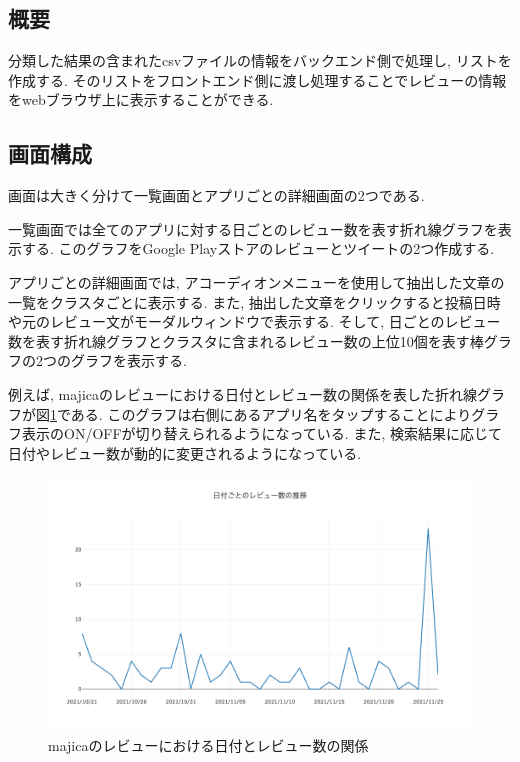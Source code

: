 \subsection{概要}
分類した結果の含まれたcsvファイルの情報をバックエンド側で処理し, リストを作成する. そのリストをフロントエンド側に渡し処理することでレビューの情報をwebブラウザ上に表示することができる. 

\subsection{画面構成}
画面は大きく分けて一覧画面とアプリごとの詳細画面の2つである. 

一覧画面では全てのアプリに対する日ごとのレビュー数を表す折れ線グラフを表示する. 
このグラフをGoogle Playストアのレビューとツイートの2つ作成する. 

アプリごとの詳細画面では, アコーディオンメニューを使用して抽出した文章の一覧をクラスタごとに表示する. また, 抽出した文章をクリックすると投稿日時や元のレビュー文がモーダルウィンドウで表示する. 
そして, 日ごとのレビュー数を表す折れ線グラフとクラスタに含まれるレビュー数の上位10個を表す棒グラフの2つのグラフを表示する. 

例えば, majicaのレビューにおける日付とレビュー数の関係を表した折れ線グラフが図\ref{fig:majica_graph}である. このグラフは右側にあるアプリ名をタップすることによりグラフ表示のON/OFFが切り替えられるようになっている. 
また, 検索結果に応じて日付やレビュー数が動的に変更されるようになっている. 

\begin{figure}[H]
  \centering
  \includegraphics[scale=0.3]
    {contents/images/majica_graph.png}
  \caption{majicaのレビューにおける日付とレビュー数の関係\label{fig:majica_graph}}
\end{figure}


